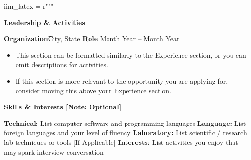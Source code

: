 iim_latex = r"""\documentclass[11pt]{article}
\begin{document}
\begin{center} \textbf{Leadership \& Activities} \end{center}
\textbf{Organization}\t\hfill City, State \textbf{Role} \hfill Month Year – Month Year
\begin{itemize}[noitemsep, topsep=0pt, partopsep=0pt, parsep=0pt] \item This section can be formatted similarly to the Experience section, or you can omit descriptions for activities. \item If this section is more relevant to the opportunity you are applying for, consider moving this above your Experience section. \end{itemize}
\begin{center} \textbf{Skills \& Interests [Note: Optional]} \end{center}
\textbf{Technical:} List computer software and programming languages \textbf{Language:} List foreign languages and your level of fluency \textbf{Laboratory:} List scientific / research lab techniques or tools [If Applicable] \textbf{Interests:} List activities you enjoy that may spark interview conversation
\end{document}
